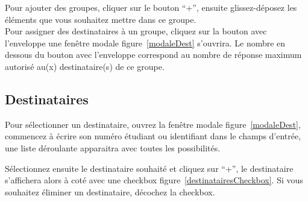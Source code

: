 \documentclass[a4paper,11pt,final]{report}
\begin{document}
Pour ajouter des groupes, cliquer sur le bouton ``+'', ensuite glissez-déposez les éléments que vous souhaitez mettre dans ce groupe.\\
Pour assigner des destinataires à un groupe, cliquez sur la bouton avec l'enveloppe une fenêtre modale figure~\ref{modaleDest} s'ouvrira.
Le nombre en dessous du bouton avec l'enveloppe correspond au nombre de réponse maximum autorisé au(x) destinataire(s) de ce groupe.

\subsection{Destinataires}
Pour sélectionner un destinataire, ouvrez la fenêtre modale figure~\ref{modaleDest}, commencez à écrire son numéro étudiant ou identifiant dans le champs d'entrée, une liste déroulante apparaitra avec toutes les possibilités. 

\noindent\begin{minipage}{\linewidth}%
\label{destinatairesCheckbox}
\end{minipage}

Sélectionnez ensuite le destinataire souhaité et cliquez sur ``+'', le destinataire s'affichera alors à coté avec une checkbox figure~\ref{destinatairesCheckbox}. Si vous souhaitez éliminer un destinataire, décochez la checkbox.


\noindent\begin{minipage}{\linewidth}%
\label{zoneGroup}
\end{minipage}
\end{document}
